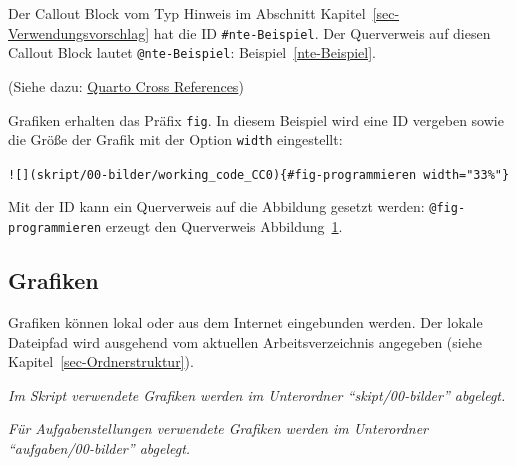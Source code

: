 \documentclass[
  letterpaper,
  DIV=11]{scrartcl}
\providecommand{\tightlist}{%
  \setlength{\itemsep}{0pt}\setlength{\parskip}{0pt}}\usepackage{longtable,booktabs,array}
\begin{document}
Der Callout Block vom Typ Hinweis im Abschnitt
Kapitel~\ref{sec-Verwendungsvorschlag} hat die ID
\texttt{\#nte-Beispiel}. Der Querverweis auf diesen Callout Block lautet
\texttt{@nte-Beispiel}: Beispiel~\ref{nte-Beispiel}.

(Siehe dazu:
\href{https://quarto.org/docs/authoring/cross-references.html}{Quarto
Cross References})

Grafiken erhalten das Präfix \texttt{fig}. In diesem Beispiel wird eine
ID vergeben sowie die Größe der Grafik mit der Option \texttt{width}
eingestellt:

\texttt{!{[}{]}(skript/00-bilder/working\_code\_CC0)\{\#fig-programmieren\ width="33\%"\}}

\begin{figure}


\caption{\label{fig-programmieren}}

\end{figure}%

Mit der ID kann ein Querverweis auf die Abbildung gesetzt werden:
\texttt{@fig-programmieren} erzeugt den Querverweis
Abbildung~\ref{fig-programmieren}.

\subsection{Grafiken}\label{grafiken}

Grafiken können lokal oder aus dem Internet eingebunden werden. Der
lokale Dateipfad wird ausgehend vom aktuellen Arbeitsverzeichnis
angegeben (siehe Kapitel~\ref{sec-Ordnerstruktur}).

\begin{description}
\tightlist
\item[Speicherort Grafiken]
\emph{Im Skript verwendete Grafiken werden im Unterordner
``skipt/00-bilder'' abgelegt.}

\emph{Für Aufgabenstellungen verwendete Grafiken werden im Unterordner
``aufgaben/00-bilder'' abgelegt.}
\end{description}
\end{document}
